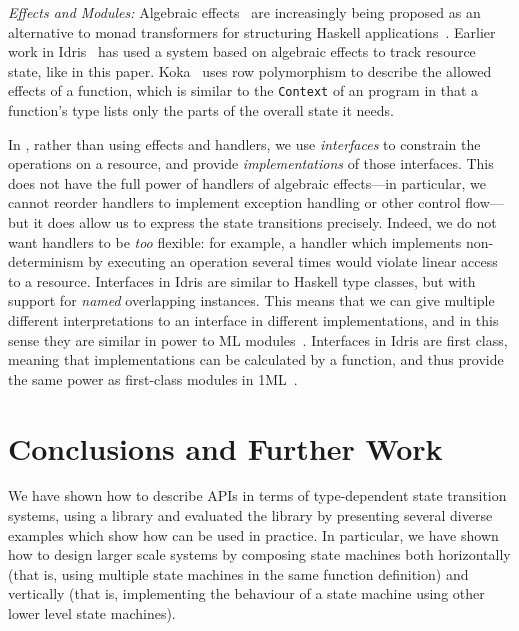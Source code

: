 
\emph{\textsf{Effects and Modules:}}
%
Algebraic effects~\citep{Plotkin2009,Bauer} are increasingly being proposed as
an alternative to monad transformers for structuring Haskell
applications~\citep{KiselyovEffects,handlers2013}.
Earlier work in Idris~\cite{brady-eff2013,brady-tfp14} has used a system
based on algebraic effects to track resource state, like \states{} in
this paper. 
Koka~\cite{Leijen2017} uses row polymorphism to describe the allowed effects
of a function, which is similar to the \texttt{Context} of an \states{}
program in that a function's type lists only the parts of the overall state it
needs.

In \states{}, rather than using effects and handlers, we use
\emph{interfaces} to constrain the operations on a resource, and provide
\emph{implementations} of those interfaces. This does not have the full
power of handlers of algebraic effects---in particular, we cannot reorder
handlers to implement exception handling or other control flow---but it
does allow us to express the state transitions precisely. Indeed, we do not
want handlers to be \emph{too} flexible: for example, a handler which
implements non-determinism by executing an operation several times would
violate linear access to a resource.
%
Interfaces in Idris are similar to Haskell type classes, but with support
for \emph{named} overlapping instances. This means that we can give multiple
different interpretations to an interface in different implementations, and
in this sense they are similar in power to ML modules~\cite{Dreyer2005}.
Interfaces in Idris are first class, meaning that implementations can be
calculated by a function, and thus provide the same power as first-class
modules in 1ML~\citet{rossberg2015}.

\section{Conclusions and Further Work}

We have shown how to describe APIs in terms of type-dependent state transition
systems, using a library \states{} and evaluated the library by presenting
several diverse examples which show how \states{} can be used in practice.
In particular, we have shown how to design larger scale systems by composing
state machines both horizontally (that is, using multiple state machines in the
same function definition) and vertically (that is, implementing the behaviour
of a state machine using other lower level state machines). 

